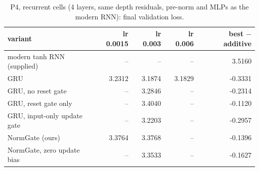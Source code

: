 \begin{table}[H]\centering\small
\caption{P4, recurrent cells (4 layers, same depth residuals, pre-norm and MLPs as the modern RNN): final validation loss.}\label{tab:p4}
\begin{tabular}{lrrrr}\toprule
variant & lr 0.0015 & lr 0.003 & lr 0.006 & best $-$ additive \\\midrule
modern tanh RNN (supplied) & -- & -- & -- & 3.5160 \\
GRU & 3.2312 & 3.1874 & 3.1829 & -0.3331 \\
GRU, no reset gate & -- & 3.2846 & -- & -0.2314 \\
GRU, reset gate only & -- & 3.4040 & -- & -0.1120 \\
GRU, input-only update gate & -- & 3.2203 & -- & -0.2957 \\
NormGate (ours) & 3.3764 & 3.3768 & -- & -0.1396 \\
NormGate, zero update bias & -- & 3.3533 & -- & -0.1627 \\
\bottomrule\end{tabular}\end{table}